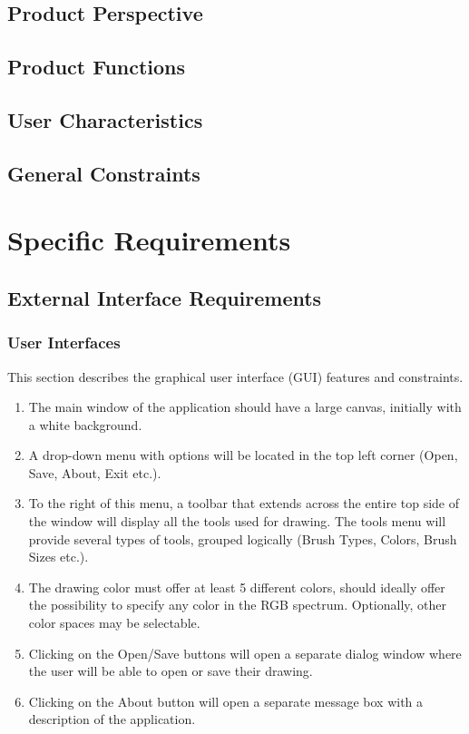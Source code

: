\documentclass{article}
\begin{document}
\subsection{Product Perspective}
\subsection{Product Functions}
\subsection{User Characteristics}
\subsection{General Constraints}

\section{Specific Requirements}
\subsection{External Interface Requirements}
\subsubsection{User Interfaces}
This section describes the graphical user interface (GUI) features and constraints.
\begin{enumerate}
\item The main window of the application should have a large canvas, initially with a white background.
\item A drop-down menu with options will be located in the top left corner (Open, Save, About, Exit etc.).
\item To the right of this menu, a toolbar that extends across the entire top side of the window will display all the tools used for drawing. The tools menu will provide several types of tools, grouped logically (Brush Types, Colors, Brush Sizes etc.).
\item The drawing color must offer at least 5 different colors, should ideally offer the possibility to specify any color in the RGB spectrum. Optionally, other color spaces may be selectable.
\item Clicking on the Open/Save buttons will open a separate dialog window where the user will be able to open or save their drawing.
\item Clicking on the About button will open a separate message box with a description of the application.
\end{enumerate}
\end{document}
